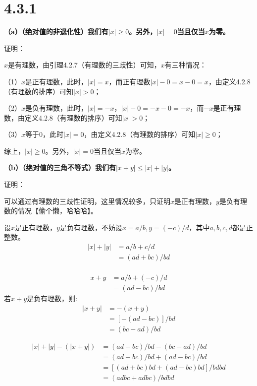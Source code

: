 \documentclass{article}
\theoremstyle{mystyle}
\begin{document}
\section*{4.3.1}

\textbf{（a）（绝对值的非退化性）我们有$|x| \geq 0$。另外，$|x|=0$当且仅当$x$为零。}

证明：

$x$是有理数，由引理4.2.7（有理数的三歧性）可知，$x$有三种情况：

（1）$x$是正有理数，此时，$|x|=x$，而正有理数$|x|-0=x-0=x$，由定义4.2.8（有理数的排序）可知$|x|>0$；

（2）$x$是负有理数，此时，$|x|=-x$，$|x|-0=-x-0=-x$，而$-x$是正有理数，由定义4.2.8（有理数的排序）可知$|x|>0$；

（3）$x$等于0，此时$|x|=0$，由定义4.2.8（有理数的排序）可知$|x| \geq 0$；

综上，$|x| \geq 0$。另外，$|x|=0$当且仅当$x$为零。

\textbf{（b）（绝对值的三角不等式）我们有$|x+y| \leq |x| + |y|$。}

证明：

可以通过有理数的三歧性证明，这里情况较多，只证明$x$是正有理数，$y$是负有理数的情况【偷个懒，哈哈哈】。

设$x$是正有理数，$y$是负有理数，不妨设$x=a/b,y=(-c)/d$，其中$a,b,c,d$都是正整数。
\begin{align*}
  |x| + |y| & = a/b + c/d  \\
            & = (ad+bc)/bd \\
\end{align*}

\begin{align*}
  x + y & = a/b + (-c)/d \\
        & = (ad-bc)/bd
\end{align*}
若$x + y$是负有理数，则:
\begin{align*}
  |x+y| & =-(x+y)        \\
        & =[-(ad-bc)]/bd \\
        & =(bc-ad)/bd
\end{align*}

\begin{align*}
  |x|+|y| - (|x+y|) & = (ad+bc)/bd - (bc-ad)/bd    \\
                    & = (ad+bc)/bd + (ad-bc)/bd    \\
                    & = [(ad+bc)bd+(ad-bc)bd]/bdbd \\
                    & = (adbc+adbc) / bdbd         \\
\end{align*}
\end{document}
